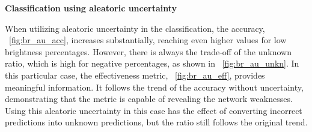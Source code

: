 \vspace{0.3cm}
\textbf{Classification using aleatoric uncertainty}
\vspace{0.1cm}

When utilizing aleatoric uncertainty in the classification, the accuracy, \Fig~\ref{fig:br_au_acc}, increases substantially, reaching even higher values for low brightness percentages. However, there is always the trade-off of the unknown ratio, which is high for negative percentages, as shown in \Fig~\ref{fig:br_au_unkn}. In this particular case, the effectiveness metric, \Fig~\ref{fig:br_au_eff}, provides meaningful information. It follows the trend of the accuracy without uncertainty, demonstrating that the metric is capable of revealing the network weaknesses. Using this aleatoric uncertainty in this case has the effect of converting incorrect predictions into unknown predictions, but the ratio still follows the original trend.


